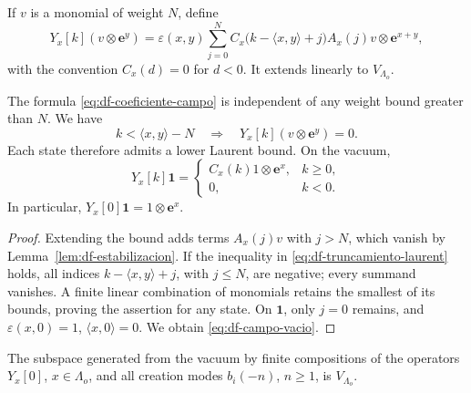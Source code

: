 \begin{definition}
If \(v\) is a monomial of weight \(N\), define
\begin{equation}
 Y_x[k](v\otimes\mathbf e^y)
 =\varepsilon(x,y)
 \sum_{j=0}^{N}
 C_x\bigl(k-\langle x,y\rangle+j\bigr)A_x(j)v
       \otimes\mathbf e^{x+y},
 \label{eq:df-coeficiente-campo}
\end{equation}
with the convention \(C_x(d)=0\) for \(d<0\). It extends linearly to \(V_{\Lambda_o}\).
\end{definition}

\begin{theorem}
\label{thm:df-campo-truncamiento} The formula \eqref{eq:df-coeficiente-campo} is independent of any weight bound greater than \(N\). We have
\begin{equation}
 k<\langle x,y\rangle-N
 \quad\Longrightarrow\quad
 Y_x[k](v\otimes\mathbf e^y)=0.
 \label{eq:df-truncamiento-laurent}
\end{equation}
Each state therefore admits a lower Laurent bound. On the vacuum,
\begin{equation}
 Y_x[k]\mathbf1=
 \begin{cases}
 C_x(k)1\otimes\mathbf e^x,&k\geq0,\\
 0,&k<0.
 \end{cases}
 \label{eq:df-campo-vacio}
\end{equation}
In particular, \(Y_x[0]\mathbf1=1\otimes\mathbf e^x\).
\end{theorem}

\begin{proof}
Extending the bound adds terms \(A_x(j)v\) with \(j>N\), which vanish by Lemma~\ref{lem:df-estabilizacion}. If the inequality in \eqref{eq:df-truncamiento-laurent} holds, all indices \(k-\langle x,y\rangle+j\), with \(j\leq N\), are negative; every summand vanishes. A finite linear combination of monomials retains the smallest of its bounds, proving the assertion for any state. On \(\mathbf1\), only \(j=0\) remains, and \(\varepsilon(x,0)=1\), \(\langle x,0\rangle=0\). We obtain \eqref{eq:df-campo-vacio}.
\end{proof}

\begin{theorem}
\label{thm:df-generacion-campos} The subspace generated from the vacuum by finite compositions of the operators \(Y_x[0]\), \(x\in\Lambda_o\), and all creation modes \(b_i(-n)\), \(n\geq1\), is \(V_{\Lambda_o}\).
\end{theorem}

